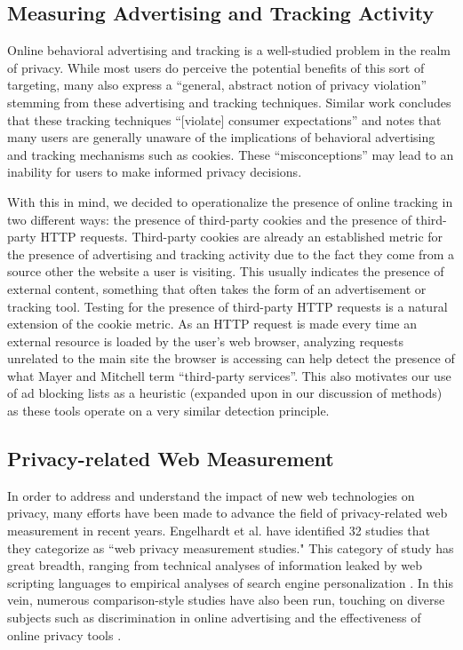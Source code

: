 \documentclass[conference]{IEEEtran}
\begin{document}
\subsection{Measuring Advertising and Tracking Activity}
Online behavioral advertising and tracking is a well-studied problem in the realm of privacy. While most users do perceive the potential benefits of this sort of targeting, many also express a ``general, abstract notion of privacy violation'' stemming from these advertising and tracking techniques\cite{ur2012}. Similar work concludes that these tracking techniques ``[violate] consumer expectations'' and notes that many users are generally unaware of the implications of behavioral advertising and tracking mechanisms such as cookies. These ``misconceptions'' may lead to an inability for users to make informed privacy decisions\cite{mcdonald2010}.

With this in mind, we decided to operationalize the presence of online tracking in two different ways: the presence of third-party cookies and the presence of third-party HTTP requests. Third-party cookies are already an established metric for the presence of advertising and tracking activity due to the fact they come from a source other the website a user is visiting. This usually indicates the presence of external content, something that often takes the form of an advertisement or tracking tool\cite{Mayer_Mitchell}. Testing for the presence of third-party HTTP requests is a natural extension of the cookie metric. As an HTTP request is made every time an external resource is loaded by the user’s web browser, analyzing requests unrelated to the main site the browser is accessing can help detect the presence of what Mayer and Mitchell term ``third-party services''\cite{Mayer_Mitchell}. This also motivates our use of ad blocking lists as a heuristic (expanded upon in our discussion of methods) as these tools operate on a very similar detection principle.

\subsection{Privacy-related Web Measurement}
In order to address and understand the impact of new web technologies on privacy, many efforts have been made to advance the field of privacy-related web measurement in recent years. Engelhardt et al. \cite{openwpm_article} have identified 32 studies that they categorize as ``web privacy measurement studies." This category of study has great breadth, ranging from technical analyses of information leaked by web scripting languages \cite{jang} to empirical analyses of search engine personalization \cite{hannak}.  In this vein, numerous comparison-style studies have also been run, touching on diverse subjects such as discrimination in online advertising \cite{sweeney} and the effectiveness of online privacy tools \cite{balebako}.
\end{document}
